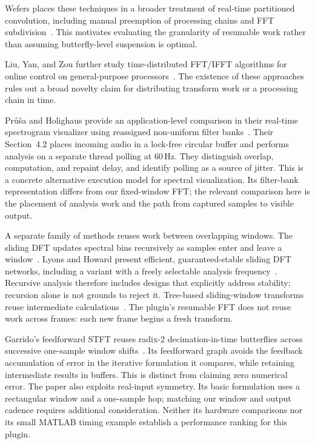 Wefers places these techniques in a broader treatment of real-time partitioned
convolution, including manual preemption of processing chains and FFT
subdivision~\cite{wefers2015}. This motivates evaluating the granularity of
resumable work rather than assuming butterfly-level suspension is optimal.

Liu, Yan, and Zou
further study time-distributed FFT/IFFT algorithms for online control on
general-purpose processors~\cite{liu2017}. The existence of these approaches
rules out a broad novelty claim for distributing transform work or a processing
chain in time.

Pr\r{u}\v{s}a and Holighaus provide an application-level comparison in their
real-time spectrogram visualizer using reassigned non-uniform filter
banks~\cite{prusa2016}. Their Section~4.2 places incoming audio in a lock-free
circular buffer and performs analysis on a separate thread polling at 60\,Hz.
They distinguish overlap, computation, and repaint delay, and identify polling
as a source of jitter. This is a concrete alternative execution model for
spectral visualization. Its filter-bank representation differs from our
fixed-window FFT; the relevant comparison here is the placement of analysis
work and the path from captured samples to visible output.

A separate family of methods reuses work between overlapping windows.
The sliding DFT updates spectral bins recursively as samples enter and leave a
window~\cite{jacobsen2003}. Lyons and Howard present efficient, guaranteed-stable
sliding DFT networks, including a variant with a freely selectable analysis
frequency~\cite{lyons2021}. Recursive analysis therefore includes designs that
explicitly address stability; recursion alone is not grounds to reject it.
Tree-based sliding-window transforms
reuse intermediate calculations~\cite{richardson2019}. The plugin's resumable FFT
does not reuse work across frames: each new frame begins a fresh transform.

Garrido's feedforward STFT reuses radix-2 decimation-in-time butterflies across
successive one-sample window shifts~\cite{garrido2016}. Its feedforward graph
avoids the feedback accumulation of error in the iterative formulation it
compares, while retaining intermediate results in buffers. This is distinct
from claiming zero numerical error. The paper also exploits real-input symmetry.
Its basic formulation uses a rectangular window and a one-sample hop; matching
our window and output cadence requires additional consideration. Neither its
hardware comparisons nor its small MATLAB timing example establish a performance
ranking for this plugin.

